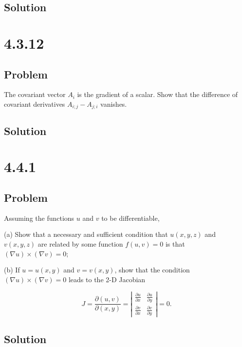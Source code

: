 \documentclass[12pt]{article}
\begin{document}
\subsection{Solution}

\newpage
\section{4.3.12}

\subsection{Problem}

The covariant vector \(A_i\) is the gradient of a scalar. Show that the difference of covariant
derivatives \(A_{i;j} - A_{j;i}\) vanishes.

\subsection{Solution}

\newpage
\section{4.4.1}

\subsection{Problem}

Assuming the functions \(u\) and \(v\) to be differentiable,

(a) Show that a necessary and sufficient condition that \(u(x, y, z)\) and \(v(x, y, z)\) are related by some function \(f(u, v)=0\) is that \((\nabla u) \times(\nabla v)=0\);

(b) If \(u=u(x, y)\) and \(v=v(x, y)\), show that the condition \((\nabla u) \times(\nabla v)=0\) leads to the 2-D Jacobian

\[
    J=\frac{\partial(u, v)}{\partial(x, y)}=\left|\begin{array}{ll}
        \frac{\partial u}{\partial x} & \frac{\partial u}{\partial y} \\
        \frac{\partial v}{\partial x} & \frac{\partial v}{\partial y}
    \end{array}\right|=0 .
\]

\subsection{Solution}
\end{document}
